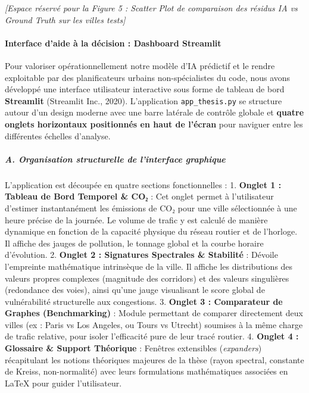\documentclass[10pt, a4paper]{article}
\begin{document}
\emph{{[}Espace réservé pour la Figure 5 : Scatter Plot de comparaison
des résidus IA vs Ground Truth sur les villes tests{]}}

\paragraph{Interface d'aide à la décision : Dashboard
Streamlit}\label{interface-daide-uxe0-la-duxe9cision-dashboard-streamlit}

Pour valoriser opérationnellement notre modèle d'IA prédictif et le
rendre exploitable par des planificateurs urbains non-spécialistes du
code, nous avons développé une interface utilisateur interactive sous
forme de tableau de bord \textbf{Streamlit} (Streamlit Inc., 2020).
L'application \texttt{app\_thesis.py} se structure autour d'un design
moderne avec une barre latérale de contrôle globale et \textbf{quatre
onglets horizontaux positionnés en haut de l'écran} pour naviguer entre
les différentes échelles d'analyse.

\subparagraph{A. Organisation structurelle de l'interface
graphique}\label{a.-organisation-structurelle-de-linterface-graphique}

L'application est découpée en quatre sections fonctionnelles : 1.
\textbf{Onglet 1 : Tableau de Bord Temporel \& CO₂} : Cet onglet permet
à l'utilisateur d'estimer instantanément les émissions de CO₂ pour une
ville sélectionnée à une heure précise de la journée. Le volume de
trafic y est calculé de manière dynamique en fonction de la capacité
physique du réseau routier et de l'horloge. Il affiche des jauges de
pollution, le tonnage global et la courbe horaire d'évolution. 2.
\textbf{Onglet 2 : Signatures Spectrales \& Stabilité} : Dévoile
l'empreinte mathématique intrinsèque de la ville. Il affiche les
distributions des valeurs propres complexes (magnitude des corridors) et
des valeurs singulières (redondance des voies), ainsi qu'une jauge
visualisant le score global de vulnérabilité structurelle aux
congestions. 3. \textbf{Onglet 3 : Comparateur de Graphes
(Benchmarking)} : Module permettant de comparer directement deux villes
(ex : Paris vs Los Angeles, ou Tours vs Utrecht) soumises à la même
charge de trafic relative, pour isoler l'efficacité pure de leur tracé
routier. 4. \textbf{Onglet 4 : Glossaire \& Support Théorique} :
Fenêtres extensibles (\emph{expanders}) récapitulant les notions
théoriques majeures de la thèse (rayon spectral, constante de Kreiss,
non-normalité) avec leurs formulations mathématiques associées en LaTeX
pour guider l'utilisateur.
\end{document}
